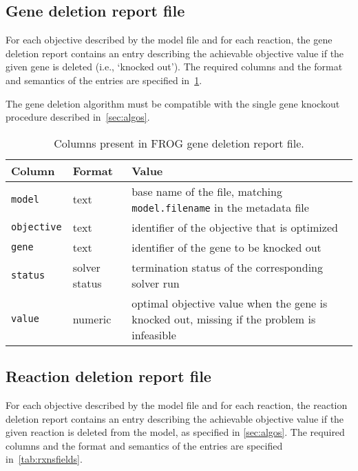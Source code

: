 \subsection{Gene deletion report file}
\label{sec:genes}

For each objective described by the model file and for each reaction, the gene deletion report contains an entry describing the achievable objective value if the given gene is deleted (i.e., `knocked out'). The required columns and the format and semantics of the entries are specified in~\cref{tab:genefields}.

The gene deletion algorithm must be compatible with the single gene knockout procedure described in~\cref{sec:algos}.

\begin{table}\tablefont
\begin{tabular}{llp{30em}}
\toprule
Column & Format & Value \\
\midrule
\verb|model|
 & text
 & base name of the file, matching \verb|model.filename| in the metadata file
 \\
\verb|objective|
 & text
 & identifier of the objective that is optimized
 \\
\verb|gene|
 & text
 & identifier of the gene to be knocked out
 \\
\verb|status|
 & solver status
 & termination status of the corresponding solver run
 \\
\verb|value|
 & numeric
 & optimal objective value when the gene is knocked out, missing if the problem is infeasible
 \\
\bottomrule
\end{tabular}
\caption{Columns present in FROG gene deletion report file.}
\label{tab:genefields}
\end{table}

\subsection{Reaction deletion report file}
\label{sec:rxns}

For each objective described by the model file and for each reaction, the reaction deletion report contains an entry describing the achievable objective value if the given reaction is deleted from the model, as specified in \cref{sec:algos}. The required columns and the format and semantics of the entries are specified in~\cref{tab:rxnsfields}.

